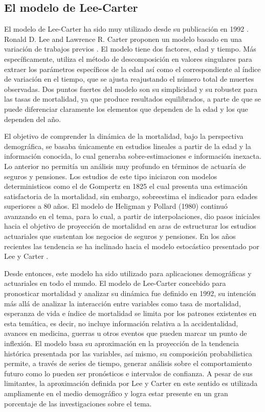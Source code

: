 \documentclass{article}
\begin{document}
\subsection{El modelo de Lee-Carter}

El modelo de Lee-Carter ha sido muy utilizado desde su publicación en 1992 \cite{lee1992modeling}. Ronald D. Lee and Lawrence R. Carter proponen un modelo basado en una variación de trabajos previos \cite{bozik1989time} \cite{lederman2012classification}. El modelo tiene dos factores, edad y tiempo. Más específicamente, utiliza el método de descomposición en valores singulares para extraer los parámetros específicos de la edad  así como el correspondiente al índice de variación en el tiempo, que se ajusta reajustando el número total de muertes observadas. Dos puntos fuertes del modelo son su simplicidad y su robustez para las tasas de mortalidad, ya que produce resultados equilibrados, a parte de que se puede diferenciar claramente los elementos que dependen de la edad y los que dependen del año.

El objetivo de comprender la dinámica de la mortalidad, bajo la perspectiva demográfica, se basaba únicamente en estudios lineales a partir de la edad y la información conocida, lo cual generaba sobre-estimaciones e información inexacta. Lo anterior no permitía un análisis muy profundo en términos de actuaría de seguros y pensiones. Los estudios de este tipo iniciaron con  modelos  deterministicos  como  el  de  Gompertz  en  1825 el  cual  presenta una estimación satisfactoria de la mortalidad, sin embargo, sobreestima el indicador para  edades  superiores  a  80  años.  El  modelo  de  Heligman  y Pollard (1980) continuó avanzando en el tema, para lo cual, a partir de interpolaciones, dio pasos iniciales hacia el objetivo de proyección de mortalidad en aras de estructurar los estudios actuariales que sustentan los negocios de seguros y pensiones. En los años recientes las tendencia se ha inclinado hacia el modelo estocástico presentado por Lee y Carter \cite{lee1992modeling}. 

Desde entonces, este modelo ha sido utilizado para aplicaciones demográficas y actuariales en todo el mundo. El modelo de Lee-Carter concebido para pronosticar mortalidad y analizar su dinámica fue definido en 1992, su intención más allá de analizar la interacción entre variables como tasa de mortalidad, esperanza de vida e índice de mortalidad se limita por los patrones existentes en esta temática, es decir, no incluye información relativa a la accidentalidad, avances en medicina, guerras u otros eventos que pueden marcar un punto de inflexión. El modelo basa su aproximación en la proyección de la tendencia histórica presentada por las variables, así mismo, su composición probabilistica permite, a través de series de tiempo, generar análisis sobre el comportamiento futuro como lo pueden ser pronósticos e intervalos de confianza. A pesar de  sus  limitantes,  la  aproximación  definida  por  Lee  y  Carter  en  este  sentido  es  utilizada ampliamente en el medio demográfico y logra estar presente en un gran porcentaje de las investigaciones sobre el tema.
\end{document}
